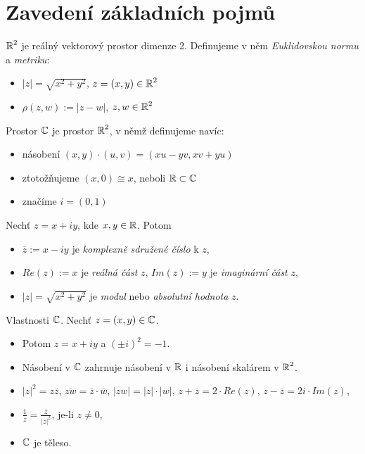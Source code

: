 \section{\texorpdfstring{Zavedení základních pojmů}{Zavedení základních pojmu}}
\vspace{5mm}
\large


\textbf{$\operatorname{\mathbb{R}} ^2$} je reálný vektorový prostor dimenze 2. Definujeme v něm \emph{Euklidovskou normu} a \emph{metriku}:
\begin{itemize}
    \item $|z| = \sqrt{x^2+y^2}$, $z = (x,y)\in\operatorname{\mathbb{R}} ^2$
    \item $\rho(z,w):= |z-w|$, $z,w\in\operatorname{\mathbb{R}} ^2$
\end{itemize}

\begin{definition}
Prostor $\operatorname{\mathbb{C}}  $ je prostor $\operatorname{\mathbb{R}} ^2$, v němž definujeme navíc:
\begin{itemize}
    \item násobení $(x,y)\cdot(u,v) = (xu-yv, xv+yu)$
    \item ztotožňujeme $(x,0) \cong x$, neboli $\operatorname{\mathbb{R}} \subset\operatorname{\mathbb{C}}  $
    \item značíme $i = (0,1)$
\end{itemize}
\end{definition}

\begin{notation}
Nechť $z = x+iy$, kde $x,y\in\operatorname{\mathbb{R}} $. Potom
\begin{itemize}
    \item $\overline{z}:= x-iy$ je \textit{komplexně sdružené číslo} k $z$,
    \item $Re(z):= x$ je \textit{reálná část} $z$, $Im(z):= y$ je \textit{imaginární část} $z$,
    \item $|z| = \sqrt{x^2+y^2}$ je \textit{modul} nebo \textit{absolutní hodnota} $z$.
\end{itemize}
\end{notation} 

\begin{properties}
Vlastnosti $\operatorname{\mathbb{C}}  $. Nechť $z = (x,y)\in\operatorname{\mathbb{C}}  $.
\begin{itemize}
    \item Potom $z = x+iy$ a $(\pm i)^2 = -1$.
    \item Násobení v $\operatorname{\mathbb{C}}  $ zahrnuje násobení v $\operatorname{\mathbb{R}} $ i násobení skalárem v $\operatorname{\mathbb{R}} ^2$.
    \item $|z|^2 = z\overline{z}$, $\overline{zw} = \overline{z} \cdot 
    \overline{w}$, $|zw| = |z|\cdot|w|$, $z+\overline{z} = 2\cdot Re(z)$, $z-\overline{z} = 2i\cdot Im(z)$,
    \item $\frac{1}{z} = \frac{\overline{z}}{|z|^2}$, je-li $z\neq 0$,
    \item $\operatorname{\mathbb{C}}  $ je těleso.
\end{itemize}
\end{properties}

